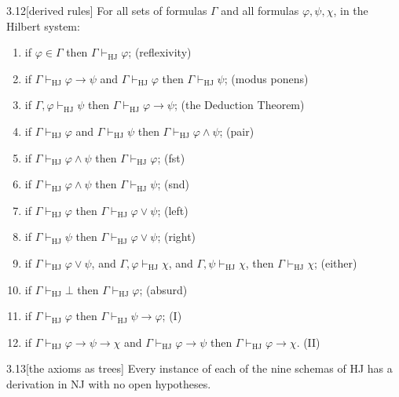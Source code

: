 \documentclass[a4paper, 11pt]{article}
\theoremstyle{definition}
\begin{document}
\begin{prop}{3.12}[derived rules]
  For all sets of formulas $\Gamma$ and all formulas $\varphi, \psi, \chi$, in the Hilbert system:
  \begin{enumerate}
    \item if $\varphi \in \Gamma$ then $\Gamma \vdash_{\text{HJ}} \varphi$; \hfill (reflexivity)
    \item if $\Gamma \vdash_{\text{HJ}} \varphi \to \psi$ and $\Gamma \vdash_{\text{HJ}} \varphi$ then $\Gamma 
    \vdash_{\text{HJ}} \psi$; \hfill (modus ponens)
    \item if $\Gamma, \varphi \vdash_{\text{HJ}} \psi$ then $\Gamma \vdash_{\text{HJ}} \varphi \to \psi$; \hfill 
    (the Deduction Theorem)
    \item if $\Gamma \vdash_{\text{HJ}} \varphi$ and $\Gamma \vdash_{\text{HJ}} \psi$ then $\Gamma \vdash_{\text{HJ}} 
    \varphi \land \psi$; \hfill (pair)
    \item if $\Gamma \vdash_{\text{HJ}} \varphi \land \psi$ then $\Gamma \vdash_{\text{HJ}} \varphi$; \hfill (fst)
    \item if $\Gamma \vdash_{\text{HJ}} \varphi \land \psi$ then $\Gamma \vdash_{\text{HJ}} \psi$; \hfill (snd)
    \item if $\Gamma \vdash_{\text{HJ}} \varphi$ then $\Gamma \vdash_{\text{HJ}} \varphi \lor \psi$; \hfill (left)
    \item if $\Gamma \vdash_{\text{HJ}} \psi$ then $\Gamma \vdash_{\text{HJ}} \varphi \lor \psi$; \hfill (right)
    \item if $\Gamma \vdash_{\text{HJ}} \varphi \lor \psi$, and $\Gamma, \varphi \vdash_{\text{HJ}} \chi$, and $\Gamma,
    \psi \vdash_{\text{HJ}} \chi$, then $\Gamma \vdash_{\text{HJ}} \chi$; \hfill (either)
    \item if $\Gamma \vdash_{\text{HJ}} \bot$ then $\Gamma \vdash_{\text{HJ}} \varphi$; \hfill (absurd)
    \item if $\Gamma \vdash_{\text{HJ}} \varphi$ then $\Gamma \vdash_{\text{HJ}} \psi \to \varphi$; \hfill (I)
    \item[] if $\Gamma \vdash_{\text{HJ}} \varphi \to \psi \to \chi$ and $\Gamma \vdash_{\text{HJ}} \varphi \to \psi$
    then $\Gamma \vdash_{\text{HJ}} \varphi \to \chi$. \hfill (II)
  \end{enumerate}
\end{prop}

\begin{lemma}{3.13}[the axioms as trees]
  Every instance of each of the nine schemas of HJ has a derivation in NJ with no open hypotheses.
\end{lemma}
\end{document}
